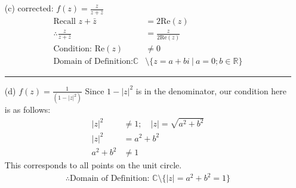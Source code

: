 \documentclass{article}
\begin{document}
\begin{enumerate}
\item[(c)] corrected: $f(z) = \frac{z}{z + \bar{z}}$
\begin{align*}
  \text{Recall } z+\bar z &= 2\text{Re}(z) \\
  \therefore \frac{z}{z + \bar{z}} &= \frac{z}{2\text{Re}(z)} \\
  \text{Condition: Re}(z) &\neq 0 \\
  \text{Domain of Definition:} \mathbb{C} &\setminus \{z = a+bi\ |\ a = 0;b\in \mathbb{R}\}
\end{align*}
 \vspace{1cm}
 \hrule
\item[(d)] $f(z) = \frac{1}{(1-|z|^2)}$
  Since $1-|z|^2$ is in the denominator, our condition here is as follows:
  \begin{align*}
    |z|^2 &\neq 1  ; \quad |z| = \sqrt{a^2 + b^2}\\
    |z|^2 &= a^2 + b^2 \\
    a^2 + b^2 &\neq 1
  \end{align*}
  This corresponds to all points on the unit circle.
  \begin{align*}
    \therefore \text{Domain of Definition: }\mathbb{C} \setminus \{|z| = a^2+b^2 = 1\}
  \end{align*}
\end{enumerate}
\newpage
\end{document}

